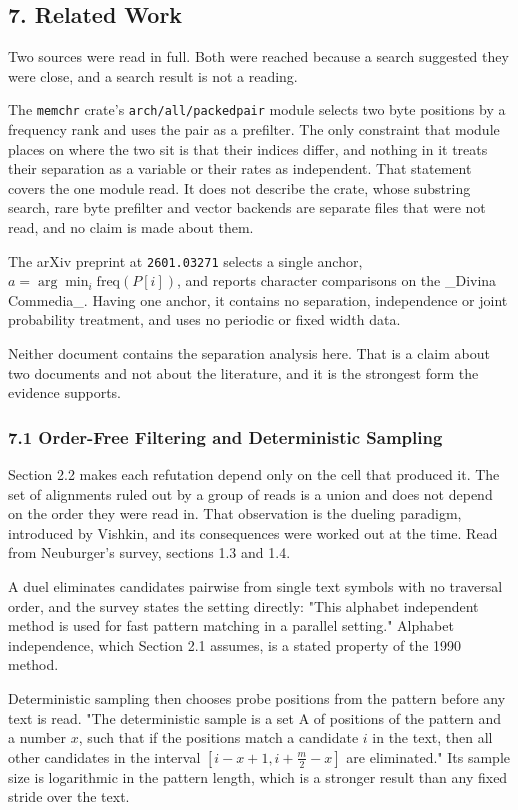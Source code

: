 \subsection{7. Related Work}

Two sources were read in full. Both were reached because a search suggested they were close, and a search result is not a reading.

The \texttt{memchr} crate's \texttt{arch/\allowbreak{}all/\allowbreak{}packedpair} module selects two byte positions by a frequency rank and uses the pair as a prefilter. The only constraint that module places on where the two sit is that their indices differ, and nothing in it treats their separation as a variable or their rates as independent. That statement covers the one module read. It does not describe the crate, whose substring search, rare byte prefilter and vector backends are separate files that were not read, and no claim is made about them.

The arXiv preprint at \texttt{2601.\allowbreak{}03271} selects a single anchor, \(a = \arg\min_i \mathrm{freq}(P[i])\), and reports character comparisons on the \_Divina Commedia\_. Having one anchor, it contains no separation, independence or joint probability treatment, and uses no periodic or fixed width data.

Neither document contains the separation analysis here. That is a claim about two documents and not about the literature, and it is the strongest form the evidence supports.

\subsubsection{7.1 Order-Free Filtering and Deterministic Sampling}

Section 2.2 makes each refutation depend only on the cell that produced it. The set of alignments ruled out by a group of reads is a union and does not depend on the order they were read in. That observation is the dueling paradigm, introduced by Vishkin, and its consequences were worked out at the time. Read from Neuburger's survey, sections 1.3 and 1.4.

A duel eliminates candidates pairwise from single text symbols with no traversal order, and the survey states the setting directly: "This alphabet independent method is used for fast pattern matching in a parallel setting." Alphabet independence, which Section 2.1 assumes, is a stated property of the 1990 method.

Deterministic sampling then chooses probe positions from the pattern before any text is read. "The deterministic sample is a set A of positions of the pattern and a number \(x\), such that if the positions match a candidate \(i\) in the text, then all other candidates in the interval \([i-x+1, i+\tfrac{m}{2}-x]\) are eliminated." Its sample size is logarithmic in the pattern length, which is a stronger result than any fixed stride over the text.

